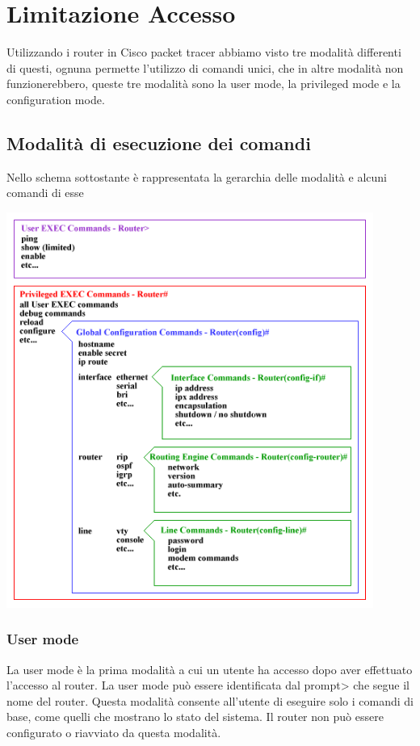 \section{Limitazione Accesso}
Utilizzando i router in Cisco packet tracer abbiamo visto tre modalità differenti di questi, ognuna permette l’utilizzo di comandi unici, che in altre modalità non funzionerebbero, queste tre modalità sono la user mode, la privileged mode e la configuration mode.

\subsection{Modalità di esecuzione dei comandi}
Nello schema sottostante è rappresentata la gerarchia delle modalità e alcuni comandi di esse

\begin{center}
    \includegraphics[width=0.9\textwidth]{images/03.limitazione.accesso/01.exec-modes.png}
\end{center}

\subsubsection{User mode}
La user mode è la prima modalità a cui un utente ha accesso dopo aver effettuato l’accesso al router. La user mode può essere identificata dal prompt> che segue il nome del router. Questa modalità consente all’utente di eseguire solo i comandi di base, come quelli che mostrano lo stato del sistema. Il router non può essere configurato o riavviato da questa modalità.


